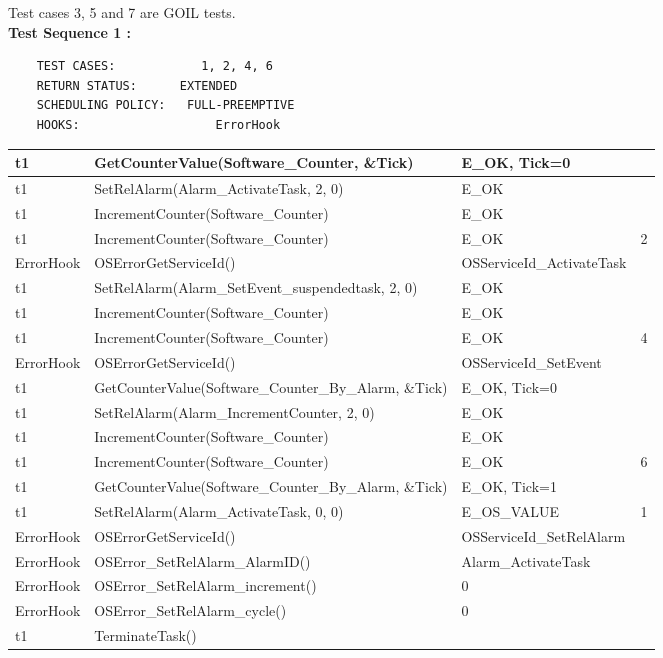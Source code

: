 \documentclass[10pt]{article}
\newlength{\Li}\settowidth{\Li}{Running}
\newlength{\Lii}\setlength{\Lii}{7cm}
\newlength{\Liiii}\setlength{\Liiii}{0.9cm}
\newlength{\Liii}\setlength{\Liii}{\textwidth} \addtolength{\Liii}{-\Li} \addtolength{\Liii}{-\Lii} \addtolength{\Liii}{-\Liiii}
\begin{document}
	Test cases 3, 5 and 7 are GOIL tests.\\

	\textbf{Test Sequence 1 :}
	\begin{lstlisting}
	TEST CASES:		       1, 2, 4, 6
	RETURN STATUS:	  	EXTENDED
	SCHEDULING POLICY:   FULL-PREEMPTIVE
	HOOKS:			         ErrorHook
	\end{lstlisting}
	
	
	\begin{supertabular}{|p{\Li}|p{\Lii}|p{\Liii}|p{\Liiii}|} \hline 
	t1	& GetCounterValue(Software\_Counter, \&Tick)					& E\_OK, Tick=0			& \\ \hline
	t1	& SetRelAlarm(Alarm\_ActivateTask, 2, 0)						& E\_OK					& \\ \hline
	t1	& IncrementCounter(Software\_Counter)							& E\_OK					& \\ \hline
	t1	& IncrementCounter(Software\_Counter)							& E\_OK					& 2 \\ \hline
	ErrorHook		& OSErrorGetServiceId()								& OSServiceId\_ActivateTask	& \\ \hline
	t1	& SetRelAlarm(Alarm\_SetEvent\_suspendedtask, 2, 0)				& E\_OK					& \\ \hline
	t1	& IncrementCounter(Software\_Counter)							& E\_OK					& \\ \hline
	t1	& IncrementCounter(Software\_Counter)							& E\_OK					& 4 \\ \hline
	ErrorHook		& OSErrorGetServiceId()								& OSServiceId\_SetEvent		& \\ \hline
	t1	& GetCounterValue(Software\_Counter\_By\_Alarm, \&Tick)			& E\_OK, Tick=0			& \\ \hline
	t1	& SetRelAlarm(Alarm\_IncrementCounter, 2, 0)					& E\_OK					& \\ \hline
	t1	& IncrementCounter(Software\_Counter)							& E\_OK					& \\ \hline
	t1	& IncrementCounter(Software\_Counter)							& E\_OK					& 6 \\ \hline
	t1	& GetCounterValue(Software\_Counter\_By\_Alarm, \&Tick)			& E\_OK, Tick=1			& \\ \hline
	t1	& SetRelAlarm(Alarm\_ActivateTask, 0, 0)						& E\_OS\_VALUE			& 1 \\ \hline
	ErrorHook		& OSErrorGetServiceId()								& OSServiceId\_SetRelAlarm	& \\ \hline
	ErrorHook		& OSError\_SetRelAlarm\_AlarmID()						& Alarm\_ActivateTask		& \\ \hline
	ErrorHook		& OSError\_SetRelAlarm\_increment()					& 0						& \\ \hline
	ErrorHook		& OSError\_SetRelAlarm\_cycle()						& 0						& \\ \hline
	
	t1	& TerminateTask()											& 						& \\ \hline
	\end{supertabular}\\
\end{document}
